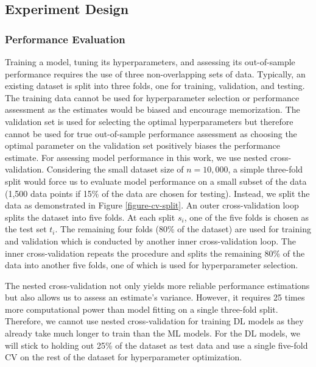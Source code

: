 \subsection{Experiment Design}
\subsubsection{Performance Evaluation}
Training a model, tuning its hyperparameters, and assessing its out-of-sample performance requires the use of three non-overlapping sets of data. Typically, an existing dataset is split into three folds, one for training, validation, and testing. The training data cannot be used for hyperparameter selection or performance assessment as the estimates would be biased and encourage memorization. The validation set is used for selecting the optimal hyperparameters but therefore cannot be used for true out-of-sample performance assessment as choosing the optimal parameter on the validation set positively biases the performance estimate.\newline
For assessing model performance in this work, we use nested cross-validation. Considering the small dataset size of $n=10,000$, a simple three-fold split would force us to evaluate model performance on a small subset of the data (1,500 data points if 15\% of the data are chosen for testing). Instead, we split the data as demonstrated in Figure \ref{figure-cv-split}. An outer cross-validation loop splits the dataset into five folds. At each split $s_i$, one of the five folds is chosen as the test set $t_i$. The remaining four folds (80\% of the dataset) are used for training and validation which is conducted by another inner cross-validation loop. The inner cross-validation repeats the procedure and splits the remaining 80\% of the data into another five folds, one of which is used for hyperparameter selection.



The nested cross-validation not only yields more reliable performance estimations but also allows us to assess an estimate's variance. However, it requires 25 times more computational power than model fitting on a single three-fold split. Therefore, we cannot use nested cross-validation for training DL models as they already take much longer to train than the ML models. For the DL models, we will stick to holding out 25\% of the dataset as test data and use a single five-fold CV on the rest of the dataset for hyperparameter optimization.



